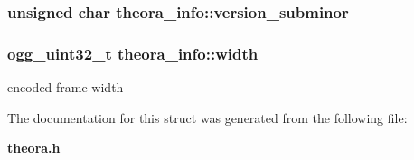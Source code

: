 \subsubsection[{version\_\-subminor}]{\setlength{\rightskip}{0pt plus 5cm}unsigned char {\bf theora\_\-info::version\_\-subminor}}\label{structtheora__info_aa07967ecd6e20bd2928ead42b6397b3d}
\subsubsection[{width}]{\setlength{\rightskip}{0pt plus 5cm}ogg\_\-uint32\_\-t {\bf theora\_\-info::width}}\label{structtheora__info_a17c2fc651bb3329f1ea6b13ff1d3957b}


encoded frame width 

The documentation for this struct was generated from the following file:\begin{DoxyCompactItemize}
\item 
{\bf theora.h}\end{DoxyCompactItemize}
